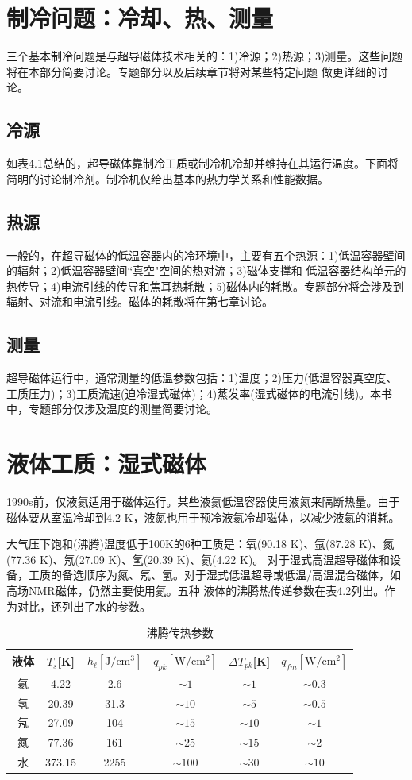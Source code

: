 \section{制冷问题：冷却、热、测量}
三个基本制冷问题是与超导磁体技术相关的：1)冷源；2)热源；3)测量。这些问题将在本部分简要讨论。专题部分以及后续章节将对某些特定问题
做更详细的讨论。
\subsection{冷源}
如表4.1总结的，超导磁体靠制冷工质或制冷机冷却并维持在其运行温度。下面将简明的讨论制冷剂。制冷机仅给出基本的热力学关系和性能数据。
\subsection{热源}
一般的，在超导磁体的低温容器内的冷环境中，主要有五个热源：1)低温容器壁间的辐射；2)低温容器壁间``真空"空间的热对流；3)磁体支撑和
低温容器结构单元的热传导；4)电流引线的传导和焦耳热耗散；5)磁体内的耗散。专题部分将会涉及到辐射、对流和电流引线。磁体的耗散将在第七章讨论。
\subsection{测量}
超导磁体运行中，通常测量的低温参数包括：1)温度；2)压力(低温容器真空度、工质压力)；3)工质流速(迫冷湿式磁体)；4)蒸发率(湿式磁体的电流引线)。本书中，专题部分仅涉及温度的测量简要讨论。

\section{液体工质：湿式磁体}
1990s前，仅液氦适用于磁体运行。某些液氦低温容器使用液氮来隔断热量。由于磁体要从室温冷却到4.2 K，液氮也用于预冷液氦冷却磁体，以减少液氦的消耗。

大气压下饱和(沸腾)温度低于100K的6种工质是：氧(90.18 K)、氩(87.28 K)、氮(77.36 K)、氖(27.09 K)、氢(20.39 K)、氦(4.22 K)。
对于湿式高温超导磁体和设备，工质的备选顺序为氮、氖、氢。对于湿式低温超导或低温/高温混合磁体，如高场NMR磁体，仍然主要使用氦。五种
液体的沸腾热传递参数在表4.2列出。作为对比，还列出了水的参数。

\begin{table}[htbp]\small
  \centering
  \caption{沸腾传热参数} \label{boilingpara}
\begin{tabular}{|c||c|c|c|c|c|}
  \hline
液体&$T_s$[K]&$h_\ell[\mathrm{J/cm^3}]$&$q_{pk}[\mathrm{W/cm^2}]$&$\Delta T_{pk}$[K]&$q_{fm}[\mathrm{W/cm^2}]$ \\ \hline \hline
氦&4.22&2.6&$\sim 1$&$\sim 1$&$\sim 0.3$\\ \hline
氢&20.39&31.3&$\sim 10$&$\sim 5$&$\sim 0.5$ \\ \hline
氖&27.09&104&$\sim 15$&$\sim 10$&$\sim 1$\\ \hline
氮&77.36&161&$\sim 25$&$\sim 15$&$\sim 2$\\ \hline
水&373.15&2255&$\sim 100$&$\sim 30$&$\sim 10$ \\ \hline
\end{tabular}
\end{table}

